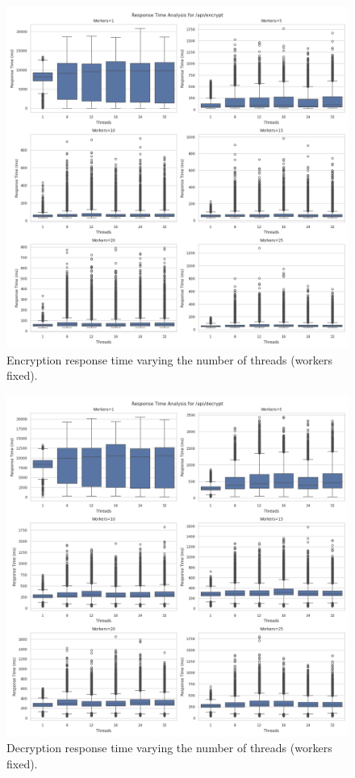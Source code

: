 \documentclass[cic,tc,english]{iiufrgs}
\numberwithin{algorithm}{chapter}
\begin{document}
        \begin{figure}
            \centering
            \includegraphics[width=\textwidth]{images/phase1/api_encrypt/response_time_workers_summary.png}
            \caption{Encryption response time varying the number of threads (workers fixed).}
            \label{fig:encrypt_response_time_workers}
        \end{figure}

        \begin{figure}
            \centering
            \includegraphics[width=\textwidth]{images/phase1/api_decrypt/response_time_workers_summary.png}
            \caption{Decryption response time varying the number of threads (workers fixed).}
            \label{fig:decrypt_response_time_workers}
        \end{figure}
\end{document}
